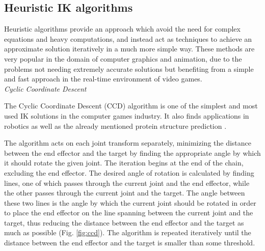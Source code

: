 \subsection{Heuristic IK algorithms}
Heuristic algorithms provide an approach which avoid the need for complex
equations and heavy computations, and instead act as techniques to achieve an
approximate solution iteratively in a much more simple way. These methods are
very popular in the domain of computer graphics and animation, due to the
problems not needing extremely accurate solutions but benefiting from a simple
and fast approach in the real-time environment of video games. \\

\noindent\textit{Cyclic Coordinate Descent}

The Cyclic Coordinate Descent (CCD) algorithm \cite{ccd} is one of the simplest and most
used IK solutions in the computer games industry. It also finds
applications in robotics as well as the already mentioned protein structure
prediction \cite{ccd_protein}. 

The algorithm acts on each joint transform separately, minimizing the distance
between the end effector and the target by finding the appropriate angle by
which it should rotate the given joint. The iteration begins at the end of the
chain, excluding the end effector. The desired angle of rotation is calculated by
finding lines, one of which passes through the current joint and the end
effector, while the other passes through the current joint and the target. The
angle between these two lines is the angle by which the current joint should
be rotated in order to place the end effector on the line spanning between the
current joint and the target, thus reducing the distance between the end
effector and the target as much as possible (Fig. \ref{fig:ccd}). The
algorithm is repeated iteratively until the distance between the end effector
and the target is smaller than some threshold.

